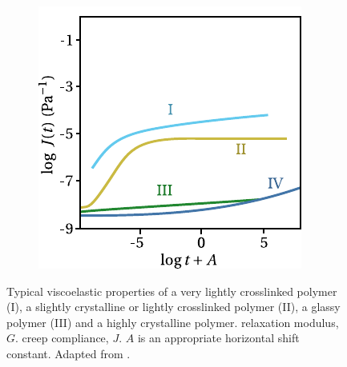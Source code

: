 \begin{figure}[hbtp]
\begin{subfigure}[b]{0.45\textwidth}
                            \includegraphics[width=\textwidth]{figures/creep_compliance_scp}
                            \caption{}
                            \label{subfig:creep_compliance_scp}
            \end{subfigure}
    \caption{Typical viscoelastic properties of a very lightly crosslinked polymer (I), a slightly crystalline or lightly crosslinked polymer (II), a glassy polymer (III) and a highly crystalline polymer.  relaxation modulus, $G$.  creep compliance, $J$. $A$ is an appropriate horizontal shift constant. Adapted from \cite{ferryViscoelasticPropertiesPolymers1980}.}
\label{fig:relax_creep_scp}
\end{figure}

